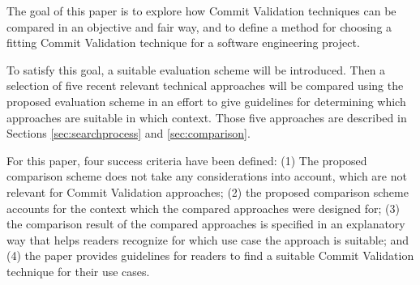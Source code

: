 The goal of this paper is to explore how Commit Validation techniques can be compared in an objective and fair way, and to define a method for choosing a fitting Commit Validation technique for a software engineering project.

To satisfy this goal, a suitable evaluation scheme will be introduced.
Then a selection of five recent relevant technical approaches will be compared using the proposed evaluation scheme in an effort to give guidelines for determining which approaches are suitable in which context. Those five approaches are described in Sections \ref{sec:searchprocess} and \ref{sec:comparison}.


For this paper, four success criteria have been defined: 
(1) The proposed comparison scheme does not take any considerations into account, which are not relevant for Commit Validation approaches;
(2) the proposed comparison scheme accounts for the context which the compared approaches were designed for;
(3) the comparison result of the compared approaches is specified in an explanatory way that helps readers recognize for which use case the approach is suitable; and%
(4) the paper provides guidelines for readers to find a suitable Commit Validation technique for their use cases.


